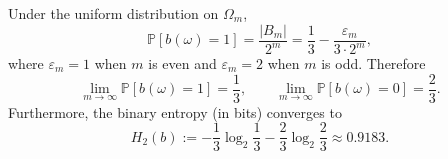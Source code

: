 \begin{corollary}\label{cor:pom-hidden-bit-entropy}
Under the uniform distribution on $\Omega_m$,
$$
\mathbb{P}[b(\omega)=1]=\frac{|B_m|}{2^m}
=\frac{1}{3}-\frac{\varepsilon_m}{3\cdot 2^m},
$$
where $\varepsilon_m=1$ when $m$ is even and $\varepsilon_m=2$ when $m$ is odd. Therefore
$$
\lim_{m\to\infty}\mathbb{P}[b(\omega)=1]=\frac{1}{3},\qquad
\lim_{m\to\infty}\mathbb{P}[b(\omega)=0]=\frac{2}{3}.
$$
Furthermore, the binary entropy (in bits) converges to
$$
H_2(b)
:=-\frac{1}{3}\log_2\frac{1}{3}-\frac{2}{3}\log_2\frac{2}{3}
\approx 0.9183.
$$
\end{corollary}



